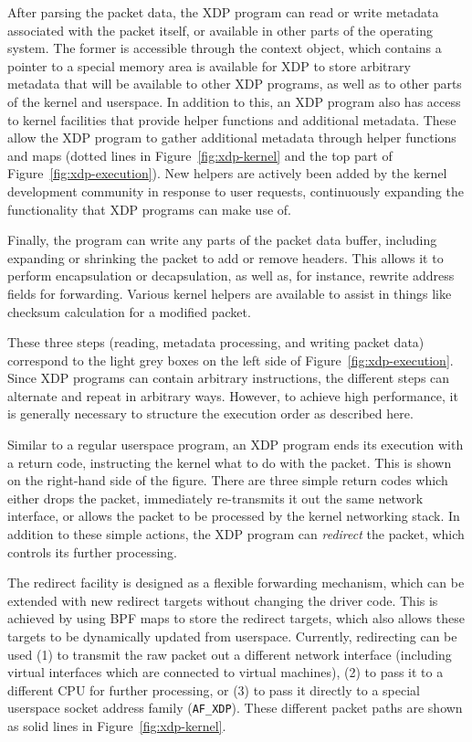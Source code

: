 \documentclass[10pt,sigconf]{acmart}
\begin{document}
After parsing the packet data, the XDP program can read or write metadata
associated with the packet itself, or available in other parts of the operating
system. The former is accessible through the context object, which contains a
pointer to a special memory area is available for XDP to store arbitrary
metadata that will be available to other XDP programs, as well as to other parts
of the kernel and userspace. In addition to this, an XDP program also has access
to kernel facilities that provide helper functions and additional metadata.
These allow the XDP program to gather additional metadata through helper
functions and maps (dotted lines in Figure~\ref{fig:xdp-kernel} and the top part
of Figure~\ref{fig:xdp-execution}). New helpers are actively been added by the
kernel development community in response to user requests, continuously
expanding the functionality that XDP programs can make use of.

Finally, the program can write any parts of the packet data buffer, including
expanding or shrinking the packet to add or remove headers. This allows it to
perform encapsulation or decapsulation, as well as, for instance, rewrite
address fields for forwarding. Various kernel helpers are available to assist in
things like checksum calculation for a modified packet.

These three steps (reading, metadata processing, and writing packet data)
correspond to the light grey boxes on the left side of
Figure~\ref{fig:xdp-execution}. Since XDP programs can contain arbitrary
instructions, the different steps can alternate and repeat in arbitrary ways.
However, to achieve high performance, it is generally necessary to structure the
execution order as described here.

Similar to a regular userspace program, an XDP program ends its execution with a
return code, instructing the kernel what to do with the packet. This is shown on
the right-hand side of the figure. There are three simple return codes which
either drops the packet, immediately re-transmits it out the same network
interface, or allows the packet to be processed by the kernel networking stack.
In addition to these simple actions, the XDP program can \emph{redirect} the
packet, which controls its further processing.

The redirect facility is designed as a flexible forwarding mechanism, which can
be extended with new redirect targets without changing the driver code. This is
achieved by using BPF maps to store the redirect targets, which also allows
these targets to be dynamically updated from userspace. Currently, redirecting
can be used (1) to transmit the raw packet out a different network interface
(including virtual interfaces which are connected to virtual machines), (2) to
pass it to a different CPU for further processing, or (3) to pass it directly to
a special userspace socket address family (\texttt{AF\_XDP}). These different
packet paths are shown as solid lines in Figure~\ref{fig:xdp-kernel}.
\end{document}
